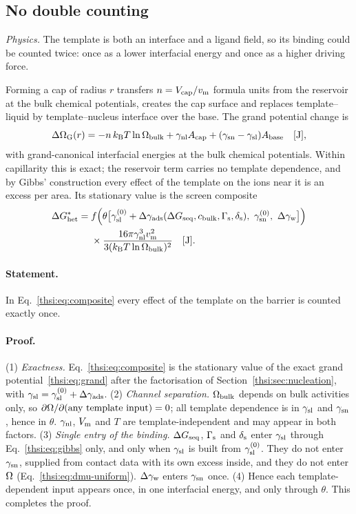 \subsection{No double counting}\label{thsi:sec:nodouble}

\textit{Physics.} The template is both an interface and a ligand field, so its binding could be counted
twice: once as a lower interfacial energy and once as a higher driving force.

Forming a cap of radius $r$ transfers $n=V_\mathrm{cap}/v_\mathrm{m}$ formula units from the reservoir at the
bulk chemical potentials, creates the cap surface and replaces template--liquid by template--nucleus
interface over the base. The grand potential change is
\begin{equation}\label{thsi:eq:grand}
\Delta\Omega_\mathrm{G}(r)=-n\,k_\mathrm{B} T\ln\Omega_\mathrm{bulk}+\gamma_\mathrm{nl} A_\mathrm{cap}+(\gamma_\mathrm{sn}-\gamma_\mathrm{sl})A_\mathrm{base} \quad[\mathrm{J}],
\end{equation}
with grand-canonical interfacial energies at the bulk chemical potentials. Within capillarity this is
exact; the reservoir term carries no template dependence, and by Gibbs' construction every effect of the
template on the ions near it is an excess per area. Its stationary value is the screen composite
\begin{equation}\label{thsi:eq:composite}
\begin{aligned}
\DGhet={}&f\Big(\theta\big[\gslz+\dga(\DGseq,\cb,\Gs,\ds),\ \gsnz,\ \dgw\big]\Big)\\
&\times\frac{16\pi\gnl^{3}\vm^{2}}{3(\kB T\ln\Omb)^{2}} \un{J}.
\end{aligned}
\end{equation}

\paragraph{Statement.} In Eq.~\eqref{thsi:eq:composite} every effect of the template on the barrier is
counted exactly once.

\paragraph{Proof.} (1) \emph{Exactness.} Eq.~\eqref{thsi:eq:composite} is the stationary value of the
exact grand potential~\eqref{thsi:eq:grand} after the factorisation of
Section~\ref{thsi:sec:nucleation}, with $\gamma_\mathrm{sl}=\gamma_\mathrm{sl}^{(0)}+\Delta\gamma_\mathrm{ads}$. (2) \emph{Channel separation.} $\Omega_\mathrm{bulk}$ depends
on bulk activities only, so $\partial\Omega/\partial(\text{any template input})=0$; all template
dependence is in $\gamma_\mathrm{sl}$ and $\gamma_\mathrm{sn}$, hence in $\theta$. $\gamma_\mathrm{nl}$, $V_\mathrm{m}$ and $T$ are template-independent
and may appear in both factors. (3) \emph{Single entry of the binding.} $\Delta G_\mathrm{seq}$, $\Gamma_\mathrm{s}$ and $\delta_\mathrm{s}$ enter
$\gamma_\mathrm{sl}$ through Eq.~\eqref{thsi:eq:gibbs} only, and only when $\gamma_\mathrm{sl}$ is built from $\gamma_\mathrm{sl}^{(0)}$. They do not
enter $\gamma_\mathrm{sn}$, supplied from contact data with its own excess inside, and they do not enter $\Omega$
(Eq.~\eqref{thsi:eq:dmu-uniform}). $\Delta\gamma_\mathrm{w}$ enters $\gamma_\mathrm{sn}$ once. (4) Hence each template-dependent input
appears once, in one interfacial energy, and only through $\theta$. This completes the proof.

